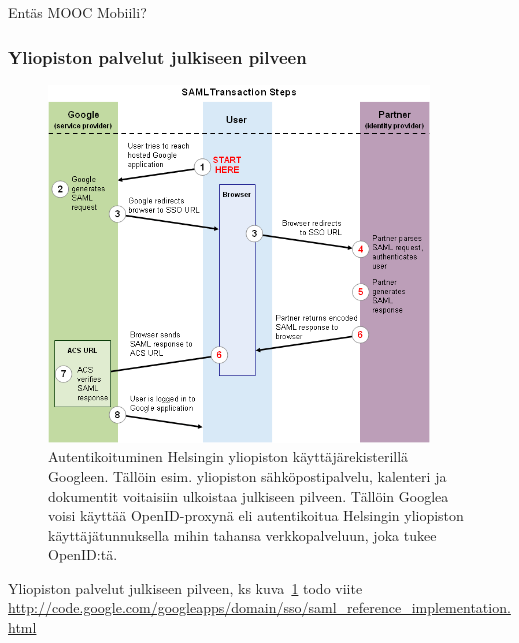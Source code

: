 \documentclass[finnish,gradu]{tktltiki}
\begin{document}

  Entäs MOOC Mobiili? %



  \subsubsection{Yliopiston palvelut julkiseen pilveen} %
  \label{ssub:yliopiston_sähköpostit_pilveen}

    \begin{figure}[h!]
      \centering
      \includegraphics[width=0.9\textwidth]{images/google_saml_workflow_vertical.png}
      \caption{Autentikoituminen Helsingin yliopiston käyttäjärekisterillä Googleen. Tällöin esim. yliopiston sähköpostipalvelu, kalenteri ja dokumentit voitaisiin ulkoistaa julkiseen pilveen. Tällöin Googlea voisi käyttää OpenID-proxynä eli autentikoitua Helsingin yliopiston käyttäjätunnuksella mihin tahansa verkkopalveluun, joka tukee OpenID:tä.}
      \label{fig:hy_julkiseen_pilveen}
    \end{figure}

    Yliopiston palvelut julkiseen pilveen, ks kuva~\ref{fig:hy_julkiseen_pilveen}
    todo viite \url{http://code.google.com/googleapps/domain/sso/saml_reference_implementation.html}
\end{document}
